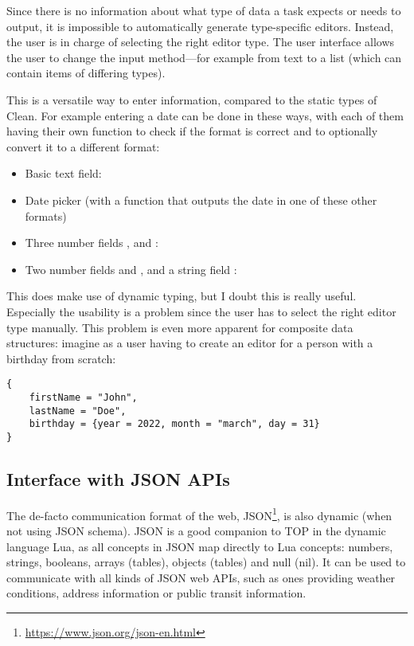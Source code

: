 Since there is no information about what type of data a task expects or needs to output, it is impossible to automatically generate type-specific editors. Instead, the user is in charge of selecting the right editor type. The user interface allows the user to change the input method---for example from text to a list (which can contain items of differing types).

This is a versatile way to enter information, compared to the static types of Clean. For example entering a date can be done in these ways, with each of them having their own function to check if the format is correct and to optionally convert it to a different format:
\begin{itemize}
    \item Basic text field: 
    \item Date picker (with a function that outputs the date in one of these other formats)
    \item Three number fields ,  and :\\
    \item Two number fields  and , and a string field :\\
\end{itemize}

This does make use of dynamic typing, but I doubt this is really useful. Especially the usability is a problem since the user has to select the right editor type manually. This problem is even more apparent for composite data structures: imagine as a user having to create an editor for a person with a birthday from scratch:

\medskip\noindent
\begin{verbatim}
{
    firstName = "John",
    lastName = "Doe",
    birthday = {year = 2022, month = "march", day = 31}
}
\end{verbatim}

\subsection{Interface with JSON APIs}\label{section-types-json}
The de-facto communication format of the web, JSON\footnote{\url{https://www.json.org/json-en.html}}, is also dynamic (when not using JSON schema). JSON is a good companion to TOP in the dynamic language Lua, as all concepts in JSON map directly to Lua concepts: numbers, strings, booleans, arrays (tables), objects (tables) and null (nil). It can be used to communicate with all kinds of JSON web APIs, such as ones providing weather conditions, address information or public transit information.

